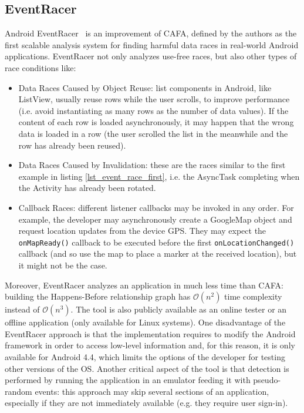 \documentclass[11pt,a4paper,notitlepage]{article}
\begin{document}
\subsection{EventRacer}
Android EventRacer~\cite{Bielik:2015:SRD:2858965.2814303} is an improvement of CAFA, defined by the authors as the first scalable analysis system for finding harmful data races in real-world Android applications. EventRacer not only analyzes use-free races, but also other types of race conditions like:
\begin{itemize}
	\item Data Races Caused by Object Reuse: list components in Android, like ListView, usually reuse rows while the user scrolls, to improve performance (i.e. avoid instantiating as many rows as the number of data values). If the content of each row is loaded asynchronously, it may happen that the wrong data is loaded in a row (the user scrolled the list in the meanwhile and the row has already been reused).
	\item Data Races Caused by Invalidation: these are the races similar to the first example in listing \ref{lst_event_race_first}, i.e. the AsyncTask completing when the Activity has already been rotated.
	\item Callback Races: different listener callbacks may be invoked in any order. For example, the developer may asynchronously create a GoogleMap object and request location updates from the device GPS. They may expect the \texttt{onMapReady()} callback to be executed before the first \texttt{onLocationChanged()} callback (and so use the map to place a marker at the received location), but it might not be the case.
\end{itemize}
Moreover, EventRacer analyzes an application in much less time than CAFA: building the Happens-Before relationship graph has $\mathcal{O}(n^2)$ time complexity instead of $\mathcal{O}(n^3)$. The tool is also publicly available as an online tester or an offline application (only available for Linux systems). One disadvantage of the EventRacer approach is that the implementation requires to modify the Android framework in order to access low-level information and, for this reason, it is only available for Android 4.4, which limits the options of the developer for testing other versions of the OS. Another critical aspect of the tool is that detection is performed by running the application in an emulator feeding it with pseudo-random events: this approach may skip several sections of an application, especially if they are not immediately available (e.g. they require user sign-in).
\end{document}
